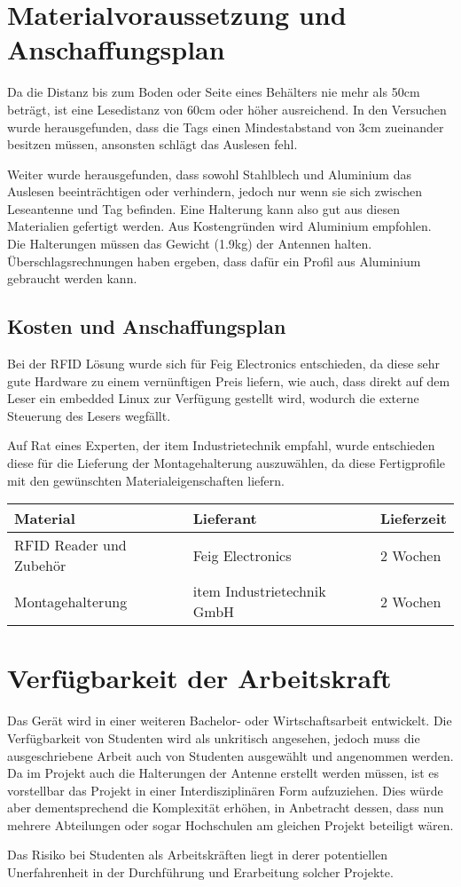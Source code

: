 \chapter{Materialvoraussetzung und Anschaffungsplan}
\label{sec:Materialvoraussetzung_Anschaffungsplan}
Da die Distanz bis zum Boden oder Seite eines Behälters nie mehr als 50cm beträgt, ist eine Lesedistanz von 60cm oder höher ausreichend. In den Versuchen wurde herausgefunden, dass die Tags einen Mindestabstand von 3cm zueinander besitzen müssen, ansonsten schlägt das Auslesen fehl.

Weiter wurde herausgefunden, dass sowohl Stahlblech und Aluminium das Auslesen beeinträchtigen oder verhindern, jedoch nur wenn sie sich zwischen Leseantenne und Tag befinden. Eine Halterung kann also gut aus diesen Materialien gefertigt werden. Aus Kostengründen wird Aluminium empfohlen. Die Halterungen müssen das Gewicht (1.9kg) der Antennen halten. Überschlagsrechnungen haben ergeben, dass dafür ein Profil aus Aluminium gebraucht werden kann.

\section{Kosten und Anschaffungsplan}
Bei der RFID Lösung wurde sich für Feig Electronics entschieden, da diese sehr gute Hardware zu einem vernünftigen Preis liefern, wie auch, dass direkt auf dem Leser ein embedded Linux zur Verfügung gestellt wird, wodurch die externe Steuerung des Lesers wegfällt.

Auf Rat eines Experten, der item Industrietechnik empfahl, wurde entschieden diese für die Lieferung der Montagehalterung auszuwählen, da diese Fertigprofile mit den gewünschten Materialeigenschaften liefern.

\begin{table}[h!]
	\centering
	\begin{tabularx}{\textwidth}{|X|X|X|}
		\hline
		\textbf{Material} & \textbf{Lieferant} & \textbf{Lieferzeit} \\
		\hline
		RFID Reader und Zubehör & Feig Electronics & 2 Wochen\\
		\hline
		Montagehalterung & item Industrietechnik GmbH & 2 Wochen\\
		\hline
	\end{tabularx}
\end{table}

\chapter{Verfügbarkeit der Arbeitskraft}
Das Gerät wird in einer weiteren Bachelor- oder Wirtschaftsarbeit entwickelt. Die Verfügbarkeit von Studenten wird als unkritisch angesehen, jedoch muss die ausgeschriebene Arbeit auch von Studenten ausgewählt und angenommen werden. Da im Projekt auch die Halterungen der Antenne erstellt werden müssen, ist es vorstellbar das Projekt in einer Interdisziplinären Form aufzuziehen. Dies würde aber dementsprechend die Komplexität erhöhen, in Anbetracht dessen, dass nun mehrere Abteilungen oder sogar Hochschulen am gleichen Projekt beteiligt wären.

Das Risiko bei Studenten als Arbeitskräften liegt in derer potentiellen Unerfahrenheit in der Durchführung und Erarbeitung solcher Projekte.
